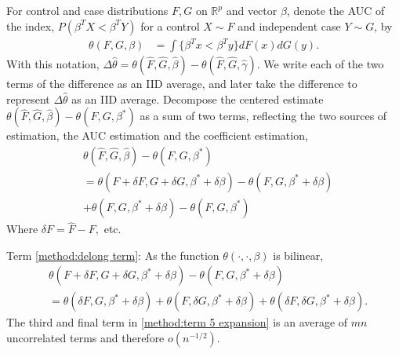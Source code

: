 \documentclass[12pt]{article}
\renewcommand{\P}{P}
\renewcommand{\t}[1]{{#1}^T}
\renewcommand{\star}[1]{{#1}^\ast}
\newcommand{\F}{F}
\newcommand{\G}{G}
\newcommand{\m}{m}
\newcommand{\n}{n}
\newcommand{\N}{m+n}
\newcommand{\auc}{\theta}
\newcommand{\aucdiffhat}{\Delta\hat{\auc}}
\newcommand{\kernel}[2]{\{#1 < #2\}}
\theoremstyle{definition}
\begin{document}
For control and case distributions $F,G$ on $\mathbb{R}^p$ and vector $\beta$, denote the AUC of the index, $P(\t\beta X < \t\beta Y)$ for a control $X\sim F$ and independent case $Y\sim G$, by
\begin{align}
  \auc(F,G,\beta) &= \int\kernel{\t\beta x}{\t\beta y}dF(x)dG(y).
\end{align}
With this notation,
$\aucdiffhat=\auc(\hat\F,\hat\G,\hat\beta)-\auc(\hat\F,\hat\G,\hat\gamma)$.
We write each of the two terms of the difference as an IID average, and later take the difference to
represent $\aucdiffhat$ as an IID average. Decompose the centered estimate
$\auc(\hat\F,\hat\G,\hat\beta)- \auc(\F,\G,\star\beta)$ as a sum of two
terms, reflecting the two sources of estimation, the AUC estimation
and the coefficient
estimation,%
\begin{align}
  &\auc(\hat\F,\hat\G,\hat\beta) - \auc(\F,\G,\star\beta)\\
  &=\auc(\F+\delta\F,\G+\delta\G,\star\beta+\delta\beta) - \auc(\F,\G,\star\beta+\delta\beta) \label{method:delong term}\\
    &+ \auc(\F,\G,\star\beta+\delta\beta)-\auc(\F,\G,\star\beta)\label{method:adjustment term}
\end{align}
Where $\delta\F=\hat\F-\F,$ etc.

Term \eqref{method:delong term}: As the function $\auc(\cdot,\cdot,\beta)$ is bilinear,
\begin{align}
  &\auc(\F+\delta\F,\G+\delta\G,\star\beta+\delta\beta) - \auc(\F,\G,\star\beta+\delta\beta)\\
  &=\auc(\delta\F,\G,\star\beta+\delta\beta)+\auc(\F,\delta\G,\star\beta+\delta\beta)+\theta(\delta\F,\delta\G,\star\beta+\delta\beta).\label{method:term 5 expansion}
\end{align}
The third and final term in \eqref{method:term 5 expansion} is an average of $\m\n$ uncorrelated terms and therefore $o(n^{-1/2})$.%
\end{document}
